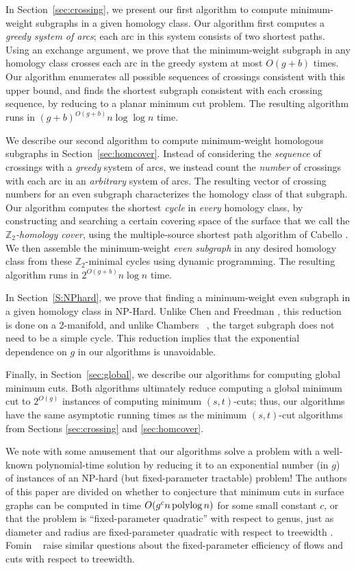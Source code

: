 \documentclass[11pt,twoside]{article}
\def\Z{\mathbb{Z}}
\begin{document}
In Section~\ref{sec:crossing}, we present our first algorithm to compute minimum-weight subgraphs in a given homology class.  Our algorithm first computes a \emph{greedy system of arcs}; each arc in this system consists of two shortest paths.  Using an exchange argument, we prove that the minimum-weight subgraph in any homology class crosses each arc in the greedy system at most $O(g+b)$ times.  Our algorithm enumerates all possible sequences of crossings consistent with this upper bound, and finds the shortest subgraph consistent with each crossing sequence, by reducing to a planar minimum cut problem.  The resulting algorithm runs  in $(g+b)^{O(g+b)}n\log \log n$ time.

We describe our second algorithm to compute minimum-weight homologous subgraphs in Section~\ref{sec:homcover}.  Instead of considering the \emph{sequence} of crossings with a \emph{greedy} system of arcs, we instead count the \emph{number} of crossings with each arc in an \emph{arbitrary} system of arcs.  The resulting vector of crossing numbers for an even subgraph characterizes the homology class of that subgraph.  Our algorithm computes the shortest \emph{cycle} in \emph{every} homology class, by constructing and searching a certain covering space of the surface  that we call the \emph{$\Z_2$-homology cover}, using the multiple-source shortest path algorithm of Cabello \etal \cite{cce-msspe-13}.  We then assemble the minimum-weight \emph{even subgraph} in any desired homology class from these $\Z_2$-minimal cycles using dynamic programming.  The resulting algorithm runs in $2^{O(g+b)}n\log n$ time.

In Section~\ref{S:NPhard}, we prove that finding a minimum-weight even subgraph in a given homology class in NP-Hard.  
Unlike Chen and Freedman \cite{cf-hrhl-10}, this reduction is done on a 2-manifold, and unlike Chambers \etal~\cite{ccelw-scsih-08}, the target subgraph does not need to be a simple cycle.
This reduction implies that the exponential dependence on $g$ in our algorithms is unavoidable.  

Finally, in Section~\ref{sec:global}, we describe our algorithms for computing global minimum cuts.  Both algorithms ultimately reduce computing a global minimum cut to  $2^{O(g)}$ instances of computing minimum $(s,t)$-cuts; thus, our algorithms have the same asymptotic running times as the minimum $(s,t)$-cut algorithms from Sections \ref{sec:crossing} and \ref{sec:homcover}.

We note with some amusement that our algorithms solve a problem with a well-known polynomial-time solution by reducing it to an exponential number (in $g$) of instances of an NP-hard (but fixed-parameter tractable) problem!  
The authors of this paper are divided on whether to conjecture that minimum cuts in surface graphs can  be computed in time $O(g^c n\operatorname{polylog} n)$ for some small constant $c$, or that the problem is “fixed-parameter quadratic” with respect to genus, just as diameter and radius are fixed-parameter quadratic with respect to treewidth \cite{aww-afpsa-16}.  
Fomin \etal~\cite{flspw-fppcg-18} raise similar questions about the fixed-parameter efficiency of flows and cuts with respect to treewidth.
\end{document}
